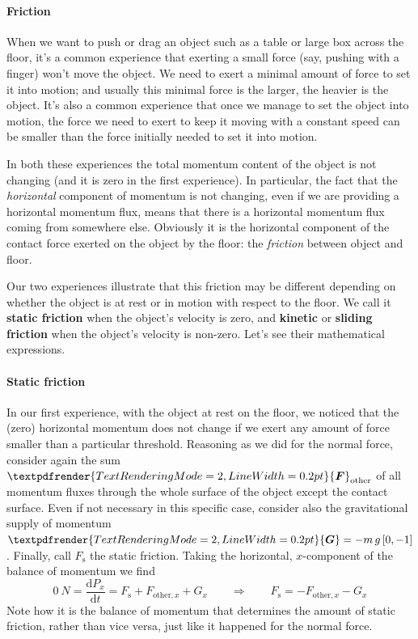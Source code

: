 \documentclass[a4paper,12pt,%
onecolumn,oneside,%
british%
]{memoir}
\renewcommand*{\bm}[1]{\textpdfrender{TextRenderingMode=2,LineWidth=0.2pt}{\boldsymbol{#1}}}
\newcommand*{\di}{\mathrm{d}}%
\renewcommand*{\|}[1][]{\nonscript\:#1\vert\nonscript\:\mathopen{}}
\newcommand*{\ym}{m}%
\newcommand*{\yF}{\bm{F}}
\newcommand*{\yFs}{F_{\text{s}}}
\newcommand*{\yFr}{\yF_{\text{other}}}
\newcommand*{\yFrx}{F_{\text{other},x}}
\newcommand*{\yG}{\bm{G}}
\begin{document}
\paragraph{Friction}

When we want to push or drag an object such as a table or large box across the floor, it's a common experience that exerting a small force (say, pushing with a finger) won't move the object. We need to exert a minimal amount of force to set it into motion; and usually this minimal force is the larger, the heavier is the object. It's also a common experience that once we manage to set the object into motion, the force we need to exert to keep it moving with a constant speed can be smaller than the force initially needed to set it into motion.

In both these experiences the total momentum content of the object is not changing (and it is zero in the first experience). In particular, the fact that the \emph{horizontal} component of momentum is not changing, even if we are providing a horizontal momentum flux, means that there is a horizontal momentum flux coming from somewhere else. Obviously it is the horizontal component of the contact force exerted on the object by the floor: the \emph{friction} between object and floor.

Our two experiences illustrate that this friction may be different depending on whether the object is at rest or in motion with respect to the floor. We call it \textbf{static friction} when the object's velocity is zero, and \textbf{kinetic} or \textbf{sliding friction} when the object's velocity is non-zero. Let's see their mathematical expressions.

\paragraph{Static friction}

In our first experience, with the object at rest on the floor, we noticed that the (zero) horizontal momentum does not change if we exert any amount of force smaller than a particular threshold. Reasoning as we did for the normal force, consider again the sum $\yFr$ of all momentum fluxes through the whole surface of the object except the contact surface. Even if not necessary in this specific case, consider also the gravitational supply of momentum $\yG=-\ym\,g\,[0,-1]$. Finally, call $\yFs$ the static friction. Taking the horizontal, $x$-component of the balance of momentum we find
\begin{equation*}
  \qty{0}{N} =
  \frac{\di P_{x}}{\di t}
  = \yFs + \yFrx + G_{x}
\qquad  \Longrightarrow\qquad
  \yFs = - \yFrx - G_{x}
\end{equation*}
Note how it is the balance of momentum that determines the amount of static friction, rather than vice versa, just like it happened for the normal force.
\end{document}
